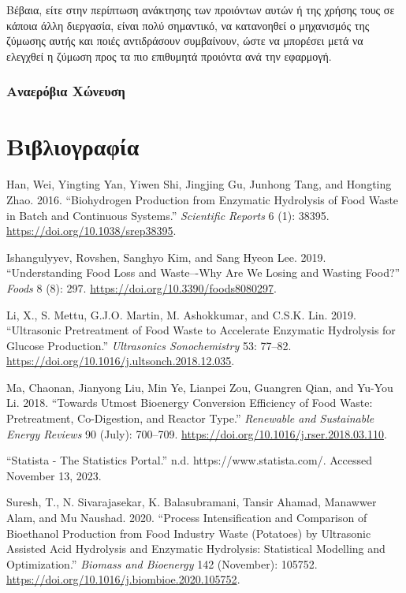 \documentclass[11pt]{report}
\begin{document}
Βέβαια, είτε στην περίπτωση ανάκτησης των προιόντων αυτών ή της χρήσης τους σε κάποια άλλη διεργασία, είναι πολύ σημαντικό, να κατανοηθεί ο μηχανισμός της ζύμωσης αυτής και ποιές αντιδράσουν συμβαίνουν, ώστε να μπορέσει μετά να ελεγχθεί η ζύμωση προς τα πιο επιθυμητά προιόντα ανά την εφαρμογή.

\section{Αναερόβια Χώνευση}
\label{sec:orga58c656}

\part*{Βιβλιογραφία}
\label{sec:orge9a96bf}
\begin{hangparas}{1.5em}{1}
\hypertarget{citeproc_bib_item_1}{Han, Wei, Yingting Yan, Yiwen Shi, Jingjing Gu, Junhong Tang, and Hongting Zhao. 2016. “Biohydrogen Production from Enzymatic Hydrolysis of Food Waste in Batch and Continuous Systems.” \textit{Scientific Reports} 6 (1): 38395. \url{https://doi.org/10.1038/srep38395}.}

\hypertarget{citeproc_bib_item_2}{Ishangulyyev, Rovshen, Sanghyo Kim, and Sang Hyeon Lee. 2019. “Understanding Food Loss and Waste–-Why Are We Losing and Wasting Food?” \textit{Foods} 8 (8): 297. \url{https://doi.org/10.3390/foods8080297}.}

\hypertarget{citeproc_bib_item_3}{Li, X., S. Mettu, G.J.O. Martin, M. Ashokkumar, and C.S.K. Lin. 2019. “Ultrasonic Pretreatment of Food Waste to Accelerate Enzymatic Hydrolysis for Glucose Production.” \textit{Ultrasonics Sonochemistry} 53: 77–82. \url{https://doi.org/10.1016/j.ultsonch.2018.12.035}.}

\hypertarget{citeproc_bib_item_4}{Ma, Chaonan, Jianyong Liu, Min Ye, Lianpei Zou, Guangren Qian, and Yu-You Li. 2018. “Towards Utmost Bioenergy Conversion Efficiency of Food Waste: Pretreatment, Co-Digestion, and Reactor Type.” \textit{Renewable and Sustainable Energy Reviews} 90 (July): 700–709. \url{https://doi.org/10.1016/j.rser.2018.03.110}.}

\hypertarget{citeproc_bib_item_5}{“Statista - The Statistics Portal.” n.d. https://www.statista.com/. Accessed November 13, 2023.}

\hypertarget{citeproc_bib_item_6}{Suresh, T., N. Sivarajasekar, K. Balasubramani, Tansir Ahamad, Manawwer Alam, and Mu Naushad. 2020. “Process Intensification and Comparison of Bioethanol Production from Food Industry Waste (Potatoes) by Ultrasonic Assisted Acid Hydrolysis and Enzymatic Hydrolysis: Statistical Modelling and Optimization.” \textit{Biomass and Bioenergy} 142 (November): 105752. \url{https://doi.org/10.1016/j.biombioe.2020.105752}.}


\end{hangparas}
\end{document}

